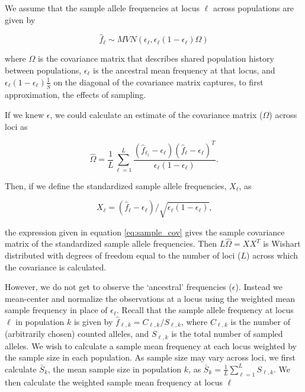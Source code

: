 \documentclass[12pt]{article}
\begin{document}
We assume that the sample allele frequencies at locus $\ell$ across populations are given by

\begin{equation}
\hat{f}_{\ell} \sim MVN(\epsilon_{\ell}, \epsilon_{\ell} (1-\epsilon_{\ell})\Omega)
\end{equation}

where $\Omega$ is the covariance matrix that describes shared population history between populations, $\epsilon_{\ell}$ is the ancestral mean frequency at that locus, and $\epsilon_{\ell}(1 - \epsilon_{\ell})  \frac{1}{\bar{S}}$ on the diagonal of the covariance matrix captures, to first approximation, the effects of sampling.

If we knew $\epsilon$, we could calculate an estimate of the covariance matrix ($\Omega$) across loci as 

\begin{equation}
\label{eq:sample_cov}
\widehat{\Omega} = \frac{1}{L} \sum_{\ell=1}^{L} \frac{(\hat{f}_{\ell_{\ell}}  - \epsilon_{\ell}) (\hat{f}_{\ell}  - \epsilon_{\ell})^T}{\epsilon_{\ell}(1-\epsilon_{\ell})} \text{.}
\end{equation}

Then, if we define the standardized sample allele frequencies, $X_\ell$, as

\begin{equation}
X_\ell = (\hat{f}_{\ell}  - \epsilon_{\ell})/\sqrt{\epsilon_{\ell}(1-\epsilon_{\ell})}\text{,}
\end{equation}

the expression given in equation \eqref{eq:sample_cov} gives the sample covariance matrix of the standardized sample allele frequencies. Then $L\widehat{\Omega} = X X^T$  is Wishart distributed with degrees of freedom equal to the number of loci ($L$) across which the covariance is calculated. 

However, we do not get to observe the `ancestral' frequencies ($\epsilon$). 
Instead we mean-center and normalize the observations at a locus using the weighted mean sample frequency in place of $\epsilon_{\ell}$.
Recall that the sample allele frequency at locus $\ell$ in population $k$ is given by $\hat{f}_{\ell,k} = C_{\ell,k}/S_{\ell,k}$,  
where $C_{\ell,k}$ is the number of (arbitrarily chosen) counted alleles,
and $S_{\ell,k}$ is the total number of sampled alleles.
We wish to calculate a sample mean frequency at each locus weighted by the sample size in each population.  As sample size may vary across loci, we first calculate $\bar{S}_k$, the mean sample size in population $k$, as $\bar{S}_k = \frac{1}{L}\sum_{\ell=1}^L S_{\ell,k}$.  We then calculate the weighted sample mean frequency at locus $\ell$ 
\end{document}
